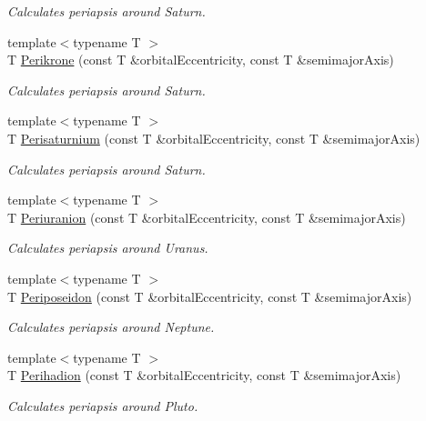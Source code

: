 \begin{DoxyCompactItemize}
\begin{DoxyCompactList}\small\item\em Calculates periapsis around Saturn. \end{DoxyCompactList}\item 
{\footnotesize template$<$typename T $>$ }\\T \hyperlink{group___periapsis_gaa56f74c44a3583b8f0d13b821c1d7422}{Perikrone} (const T \&orbital\+Eccentricity, const T \&semimajor\+Axis)
\begin{DoxyCompactList}\small\item\em Calculates periapsis around Saturn. \end{DoxyCompactList}\item 
{\footnotesize template$<$typename T $>$ }\\T \hyperlink{group___periapsis_ga60a50d09d29ebe47cbbfc125c2ea42bf}{Perisaturnium} (const T \&orbital\+Eccentricity, const T \&semimajor\+Axis)
\begin{DoxyCompactList}\small\item\em Calculates periapsis around Saturn. \end{DoxyCompactList}\item 
{\footnotesize template$<$typename T $>$ }\\T \hyperlink{group___periapsis_gab8b8131a617dd2d2a4de1d48accd7442}{Periuranion} (const T \&orbital\+Eccentricity, const T \&semimajor\+Axis)
\begin{DoxyCompactList}\small\item\em Calculates periapsis around Uranus. \end{DoxyCompactList}\item 
{\footnotesize template$<$typename T $>$ }\\T \hyperlink{group___periapsis_ga237e7af3794202c67e65f64f4c8abc2a}{Periposeidon} (const T \&orbital\+Eccentricity, const T \&semimajor\+Axis)
\begin{DoxyCompactList}\small\item\em Calculates periapsis around Neptune. \end{DoxyCompactList}\item 
{\footnotesize template$<$typename T $>$ }\\T \hyperlink{group___periapsis_gafb16e46e55078b38604eef0d7c7c40c4}{Perihadion} (const T \&orbital\+Eccentricity, const T \&semimajor\+Axis)
\begin{DoxyCompactList}\small\item\em Calculates periapsis around Pluto. \end{DoxyCompactList}\item 

\end{DoxyCompactItemize}
